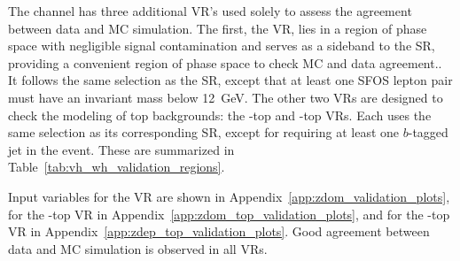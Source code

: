The \wh{} channel has three additional VR's used solely to assess the agreement between data and MC simulation. The first, the \zdom{} VR, lies in a region of phase space with negligible signal contamination and serves as a sideband to the SR, providing a convenient region of phase space to check MC and data agreement.\@. It follows the same selection as the \zdom{} SR, except that at least one SFOS lepton pair must have an invariant mass below 12~GeV. The other two VRs are designed to check the modeling of top backgrounds: the \zdom{}-top and \zdep{}-top VRs. Each uses the same selection as its corresponding SR, except for requiring at least one $b$-tagged jet in the event. These are summarized in Table~\ref{tab:vh_wh_validation_regions}.
\begin{table}[htp]
    \centering
    \caption{Summary of all of the control and validation regions defined in this analysis.\label{tab:vh_wh_validation_regions}}
\end{table}

Input variables for the \zdom{} VR are shown in Appendix~\ref{app:zdom_validation_plots}, for the \zdom{}-top VR in Appendix~\ref{app:zdom_top_validation_plots}, and for the \zdep{}-top VR in Appendix~\ref{app:zdep_top_validation_plots}. Good agreement between data and MC simulation is observed in all VRs.
